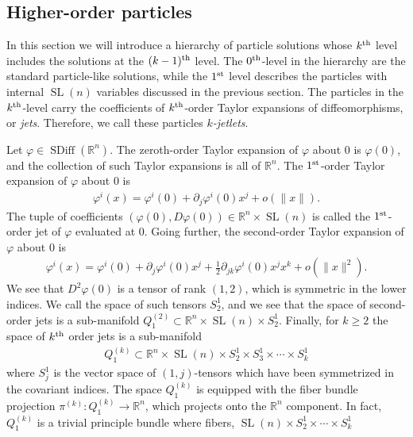 \documentclass[12pt]{amsart}
\newcommand{\R}{\ensuremath{\mathbb{R}}}
\DeclareMathOperator{\SDiff}{SDiff}
\DeclareMathOperator{\SL}{SL}
\begin{document}
  \subsection{Higher-order particles}
  \label{sec:higher_order}
  In this section we will introduce a hierarchy of particle solutions whose $k^{\rm th}$ level includes the solutions at the $(k-1)^{\rm th}$ level.
  The $0^{\rm th}$-level in the hierarchy are the standard particle-like solutions,
  while the $1^{\rm st}$ level describes the particles with internal $\SL(n)$ variables
  discussed in the previous section.
  The particles in the $k^{\rm th}$-level carry the coefficients of
  $k^{\rm th}$-order Taylor expansions of diffeomorphisms,
  or \emph{jets}.
  Therefore, we call these particles \emph{$k$-jetlets}.

  Let $\varphi \in \SDiff(\R^n)$.
  The zeroth-order Taylor expansion of $\varphi$ about $0$
  is $\varphi(0)$, and the collection of such Taylor
  expansions is all of $\R^n$.
  The $1^{\rm st}$-order Taylor expansion of $\varphi$ about $0$ is
  \begin{align*}
    \varphi^i( x) = \varphi^i(0) + \partial_j \varphi^i(0) x^j + o( \|x\|).
  \end{align*}
  The tuple of coefficients $(\varphi(0) , D\varphi(0) ) \in \R^n \times \SL(n)$ is
  called the $1^{\rm st}$-order jet of $\varphi$ evaluated at $0$.
  Going further, the second-order Taylor expansion of $\varphi$ about $0$
  is
  \begin{align*}
    \varphi^i(x) = \varphi^i(0) + \partial_j \varphi^i(0) x^j + 
    \frac{1}{2} \partial_{jk} \varphi^i(0) x^j x^k + o( \| x\|^2).
  \end{align*}
  We see that $D^2\varphi(0)$ is a tensor of rank $(1,2)$, which is
  symmetric in the lower indices.
  We call the space of such tensors $S^1_2$,
  and we see that the space of second-order jets is a sub-manifold $Q^{(2)}_1 \subset \R^n \times \SL(n) \times S^1_2$.
  Finally, for $k \geq 2$ the space of $k^{\rm th}$ order jets is a sub-manifold
  \begin{align*}
    Q_1^{(k)} \subset \R^n \times \SL(n) \times S^1_2 \times S^1_3 \times \cdots\times S^1_k
  \end{align*}
  where $S^1_j$ is the vector space of $(1,j)$-tensors which
  have been symmetrized in the covariant indices.
  The space $Q_1^{(k)}$ is equipped with the fiber bundle
  projection $\pi^{(k)} : Q_1^{(k)} \to \R^n$,
  which projects onto the $\R^n$ component.
  In fact, $Q_1^{(k)}$ is a trivial principle bundle
  where fibers, $\SL(n) \times S^1_2 \times \cdots \times S^1_k$
\end{document}
